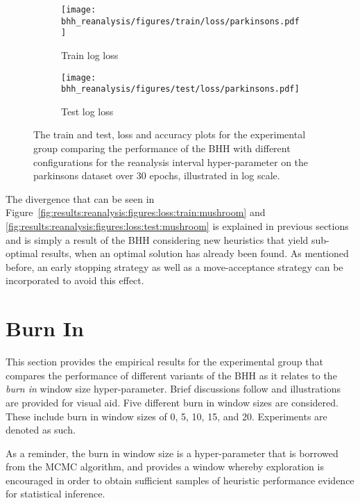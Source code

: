 \begin{figure}[htbp]
	\begin{subfigure}{0.5\textwidth}
		\centering
		\texttt{[image: bhh\_reanalysis/figures/train/loss/parkinsons.pdf]}
		\caption{Train log loss}
		\label{fig:results:reanalysis:figures:loss:train:parkinsons}
	\end{subfigure}
	\begin{subfigure}{0.5\textwidth}
		\centering
		\texttt{[image: bhh\_reanalysis/figures/test/loss/parkinsons.pdf]}
		\caption{Test log loss}
		\label{fig:results:reanalysis:figures:loss:test:parkinsons}
	\end{subfigure}
	\par\bigskip
	\caption{The train and test, loss and accuracy plots for the experimental group comparing the performance of the \acs{BHH} with different configurations for the reanalysis interval hyper-parameter on the parkinsons dataset over 30 epochs, illustrated in log scale.}
	\label{fig:results:reanalysis:figures:parkinsons}
\end{figure}

The divergence that can be seen in Figure~\ref{fig:results:reanalysis:figures:loss:train:mushroom} and \ref{fig:results:reanalysis:figures:loss:test:mushroom} is explained in previous sections and is simply a result of the \acs{BHH} considering new heuristics that yield sub-optimal results, when an optimal solution has already been found. As mentioned before, an early stopping strategy as well as a move-acceptance strategy can be incorporated to avoid this effect.

\section{Burn In}\label{sec:results:burn_in}

This section provides the empirical results for the experimental group that compares the performance of different variants of the \acs{BHH} as it relates to the \textit{burn in} window size hyper-parameter. Brief discussions follow and illustrations are provided for visual aid. Five different burn in window sizes are considered. These include burn in window sizes of 0, 5, 10, 15, and 20. Experiments are denoted as such.

As a reminder, the burn in window size is a hyper-parameter that is borrowed from the \acs{MCMC} algorithm, and provides a window whereby exploration is encouraged in order to obtain sufficient samples of heuristic performance evidence for statistical inference.


